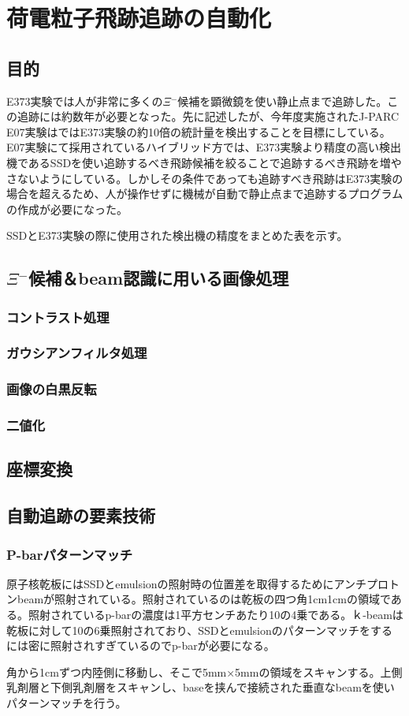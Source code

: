 \documentclass[12pt,a4paper]{jarticle}
\begin{document}
\newpage
\section{荷電粒子飛跡追跡の自動化}
\subsection{目的}
E373実験では人が非常に多くの$\Xi$$^-$候補を顕微鏡を使い静止点まで追跡した。この追跡には約数年が必要となった。先に記述したが、今年度実施されたJ-PARC E07実験はではE373実験の約10倍の統計量を検出することを目標にしている。E07実験にて採用されているハイブリッド方では、E373実験より精度の高い検出機であるSSDを使い追跡するべき飛跡候補を絞ることで追跡するべき飛跡を増やさないようにしている。しかしその条件であっても追跡すべき飛跡はE373実験の場合を超えるため、人が操作せずに機械が自動で静止点まで追跡するプログラムの作成が必要になった。\par
SSDとE373実験の際に使用された検出機の精度をまとめた表を示す。
\subsection{$\Xi$$^-$候補＆beam認識に用いる画像処理}
\subsubsection{コントラスト処理}
\subsubsection{ガウシアンフィルタ処理}
\subsubsection{画像の白黒反転}
\subsubsection{二値化}
\subsection{座標変換}
\subsection{自動追跡の要素技術}
\subsubsection{P-barパターンマッチ}
原子核乾板にはSSDとemulsionの照射時の位置差を取得するためにアンチプロトンbeamが照射されている。照射されているのは乾板の四つ角1cm1cmの領域である。照射されているp-barの濃度は1平方センチあたり10の4乗である。ｋ-beamは乾板に対して10の6乗照射されており、SSDとemulsionのパターンマッチをするには密に照射されすぎているのでp-barが必要になる。\par
角から1cmずつ内陸側に移動し、そこで5mm×5mmの領域をスキャンする。上側乳剤層と下側乳剤層をスキャンし、baseを挟んで接続された垂直なbeamを使いパターンマッチを行う。\par
\end{document}
